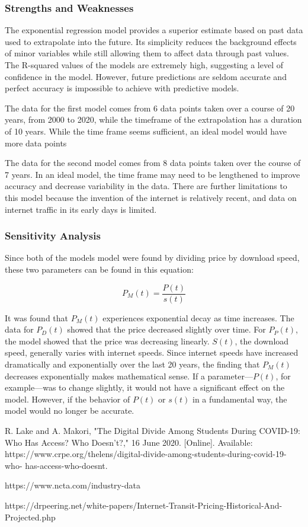     \subsubsection*{Strengths and Weaknesses}

    The exponential regression model provides a superior estimate based on past data used to extrapolate into the future. Its simplicity reduces the background effects of minor variables while still allowing them to affect data through past values. The R-squared values of the models are extremely high, suggesting a level of confidence in the model. However, future predictions are seldom accurate and perfect accuracy is impossible to achieve with predictive models.

    The data for the first model comes from 6 data points taken over a course of 20 years, from 2000 to 2020, while the timeframe of the extrapolation has a duration of 10 years. While the time frame seems sufficient, an ideal model would have more data points 

    The data for the second model comes from 8 data points taken over the course of 7 years. In an ideal model, the time frame may need to be lengthened to improve accuracy and decrease variability in the data. There are further limitations to this model because the invention of the internet is relatively recent, and data on internet traffic in its early days is limited.

    \subsubsection*{Sensitivity Analysis}
    Since both of the models model were found by dividing price by download speed, these two parameters can be found in this equation:
    
    $$P_M(t)=\frac{P(t)}{s(t)}$$
    
    It was found that $P_M(t)$ experiences exponential decay as time increases. The data for $P_D(t)$ showed that the price decreased slightly over time. For $P_P(t)$, the model showed that the price was decreasing linearly. $S(t)$, the download speed, generally varies with internet speeds. Since internet speeds have increased dramatically and exponentially over the last 20 years, the finding that $P_M(t)$ decreases exponentially makes mathematical sense. If a parameter—$P(t)$, for example—was to change slightly, it would not have a significant effect on the model. However, if the behavior of $P(t)$ or $s(t)$ in a fundamental way, the model would no longer be accurate.

\pagebreak
\begin{thebibliography}{3}

\bibitem{} 
R. Lake and A. Makori, "The Digital Divide Among Students During COVID-19: Who Has Access? Who Doesn’t?," 16 June 2020. [Online]. Available: https://www.crpe.org/thelens/digital-divide-among-students-during-covid-19-who-
has-access-who-doesnt.

\bibitem{} 
https://www.ncta.com/industry-data

\bibitem{}
https://drpeering.net/white-papers/Internet-Transit-Pricing-Historical-And-Projected.php


\end{thebibliography}

